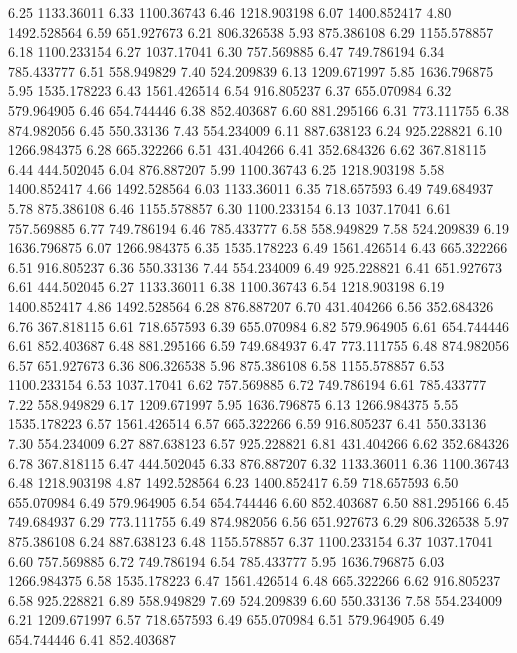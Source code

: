 6.25 	1133.36011
6.33 	1100.36743
6.46 	1218.903198
6.07 	1400.852417
4.80 	1492.528564
6.59 	651.927673
6.21 	806.326538
5.93 	875.386108
6.29 	1155.578857
6.18 	1100.233154
6.27 	1037.17041
6.30 	757.569885
6.47 	749.786194
6.34 	785.433777
6.51 	558.949829
7.40 	524.209839
6.13 	1209.671997
5.85 	1636.796875
5.95 	1535.178223
6.43 	1561.426514
6.54 	916.805237
6.37 	655.070984
6.32 	579.964905
6.46 	654.744446
6.38 	852.403687
6.60 	881.295166
6.31 	773.111755
6.38 	874.982056
6.45 	550.33136
7.43 	554.234009
6.11 	887.638123
6.24 	925.228821
6.10 	1266.984375
6.28 	665.322266
6.51 	431.404266
6.41 	352.684326
6.62 	367.818115
6.44 	444.502045
6.04 	876.887207
5.99 	1100.36743
6.25 	1218.903198
5.58 	1400.852417
4.66 	1492.528564
6.03 	1133.36011
6.35 	718.657593
6.49 	749.684937
5.78 	875.386108
6.46 	1155.578857
6.30 	1100.233154
6.13 	1037.17041
6.61 	757.569885
6.77 	749.786194
6.46 	785.433777
6.58 	558.949829
7.58 	524.209839
6.19 	1636.796875
6.07 	1266.984375
6.35 	1535.178223
6.49 	1561.426514
6.43 	665.322266
6.51 	916.805237
6.36 	550.33136
7.44 	554.234009
6.49 	925.228821
6.41 	651.927673
6.61 	444.502045
6.27 	1133.36011
6.38 	1100.36743
6.54 	1218.903198
6.19 	1400.852417
4.86 	1492.528564
6.28 	876.887207
6.70 	431.404266
6.56 	352.684326
6.76 	367.818115
6.61 	718.657593
6.39 	655.070984
6.82 	579.964905
6.61 	654.744446
6.61 	852.403687
6.48 	881.295166
6.59 	749.684937
6.47 	773.111755
6.48 	874.982056
6.57 	651.927673
6.36 	806.326538
5.96 	875.386108
6.58 	1155.578857
6.53 	1100.233154
6.53 	1037.17041
6.62 	757.569885
6.72 	749.786194
6.61 	785.433777
7.22 	558.949829
6.17 	1209.671997
5.95 	1636.796875
6.13 	1266.984375
5.55 	1535.178223
6.57 	1561.426514
6.57 	665.322266
6.59 	916.805237
6.41 	550.33136
7.30 	554.234009
6.27 	887.638123
6.57 	925.228821
6.81 	431.404266
6.62 	352.684326
6.78 	367.818115
6.47 	444.502045
6.33 	876.887207
6.32 	1133.36011
6.36 	1100.36743
6.48 	1218.903198
4.87 	1492.528564
6.23 	1400.852417
6.59 	718.657593
6.50 	655.070984
6.49 	579.964905
6.54 	654.744446
6.60 	852.403687
6.50 	881.295166
6.45 	749.684937
6.29 	773.111755
6.49 	874.982056
6.56 	651.927673
6.29 	806.326538
5.97 	875.386108
6.24 	887.638123
6.48 	1155.578857
6.37 	1100.233154
6.37 	1037.17041
6.60 	757.569885
6.72 	749.786194
6.54 	785.433777
5.95 	1636.796875
6.03 	1266.984375
6.58 	1535.178223
6.47 	1561.426514
6.48 	665.322266
6.62 	916.805237
6.58 	925.228821
6.89 	558.949829
7.69 	524.209839
6.60 	550.33136
7.58 	554.234009
6.21 	1209.671997
6.57 	718.657593
6.49 	655.070984
6.51 	579.964905
6.49 	654.744446
6.41 	852.403687
